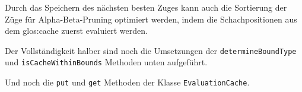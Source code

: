 Durch das Speichern des nächsten besten Zuges kann auch die Sortierung der Züge für Alpha-Beta-Pruning optimiert werden, indem die Schachpositionen aus dem \gls{glos:cache} zuerst evaluiert werden.


Der Vollständigkeit halber sind noch die Umsetzungen der \texttt{determineBoundType} und \texttt{isCacheWithinBounds} Methoden unten aufgeführt.


Und noch die \texttt{put} und \texttt{get} Methoden der Klasse \texttt{EvaluationCache}.
